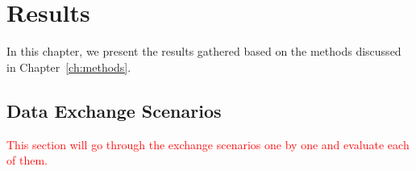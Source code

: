 \chapter{Results}\label{ch:results}

\begin{chapterabstract}
    In this chapter, we present the results gathered based on the methods discussed in Chapter~\ref{ch:methods}.
\end{chapterabstract}

\section{Data Exchange Scenarios}\label{sec:data-exchange-scenarios}

\textcolor{red}{This section will go through the exchange scenarios one by one and evaluate each of them.}
